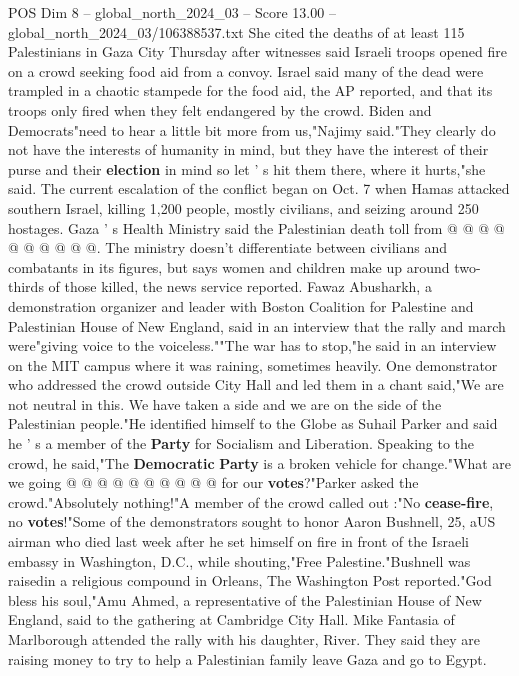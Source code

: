 \begin{textsample}{POS Dim 8 – global\_north\_2024\_03 – Score 13.00 – global\_north\_2024\_03/106388537.txt}
She cited the deaths of at least 115 Palestinians in Gaza City Thursday after witnesses said Israeli troops opened fire on a crowd seeking food aid from a convoy.
Israel said many of the dead were trampled in a chaotic stampede for the food aid, the AP reported, and that its troops only fired when they felt endangered by the crowd.
Biden and Democrats"need to hear a little bit more from us,"Najimy said."They clearly do not have the interests of humanity in mind, but they have the interest of their purse and their \textbf{election} in mind so let ' s hit them there, where it hurts,"she said.
The current escalation of the conflict began on Oct. 7 when Hamas attacked southern Israel, killing 1,200 people, mostly civilians, and seizing around 250 hostages.
Gaza ' s Health Ministry said the Palestinian death toll from @ @ @ @ @ @ @ @ @ @.
The ministry doesn't differentiate between civilians and combatants in its figures, but says women and children make up around two-thirds of those killed, the news service reported.
Fawaz Abusharkh, a demonstration organizer and leader with Boston Coalition for Palestine and Palestinian House of New England, said in an interview that the rally and march were"giving voice to the voiceless.""The war has to stop,"he said in an interview on the MIT campus where it was raining, sometimes heavily.
One demonstrator who addressed the crowd outside City Hall and led them in a chant said,"We are not neutral in this.
We have taken a side and we are on the side of the Palestinian people."He identified himself to the Globe as Suhail Parker and said he ' s a member of the \textbf{Party} for Socialism and Liberation.
Speaking to the crowd, he said,"The \textbf{Democratic} \textbf{Party} is a broken vehicle for change."What are we going @ @ @ @ @ @ @ @ @ @ for our \textbf{votes}?"Parker asked the crowd."Absolutely nothing!"A member of the crowd called out :"No \textbf{cease-fire}, no \textbf{votes}!"Some of the demonstrators sought to honor Aaron Bushnell, 25, aUS airman who died last week after he set himself on fire in front of the Israeli embassy in Washington, D.C., while shouting,"Free Palestine."Bushnell was raisedin a religious compound in Orleans, The Washington Post reported."God bless his soul,"Amu Ahmed, a representative of the Palestinian House of New England, said to the gathering at Cambridge City Hall.
Mike Fantasia of Marlborough attended the rally with his daughter, River.
They said they are raising money to try to help a Palestinian family leave Gaza and go to Egypt.

\end{textsample}
